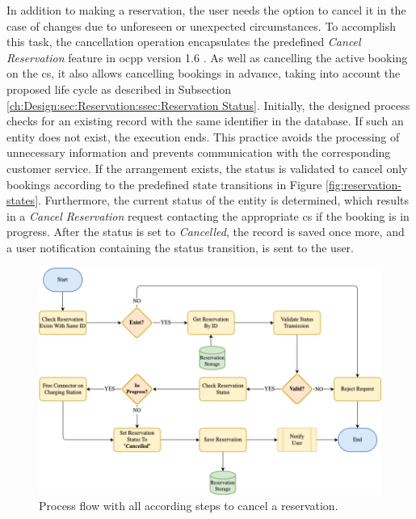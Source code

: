 In addition to making a reservation, the user needs the option to cancel it in the case of changes due to unforeseen or unexpected circumstances.
To accomplish this task, the cancellation operation encapsulates the predefined \textit{Cancel Reservation} feature in \acrshort{ocpp} version 1.6 \cite{noauthor_ocpp_nodate}. As well as cancelling the active booking on the \acrshort{cs}, it also allows cancelling bookings in advance, taking into account the proposed life cycle as described in Subsection \ref{ch:Design:sec:Reservation:ssec:Reservation Status}.
Initially, the designed process checks for an existing record with the same identifier in the database. If such an entity does not exist, the execution ends. This practice avoids the processing of unnecessary information and prevents communication with the corresponding customer service.
If the arrangement exists, the status is validated to cancel only bookings according to the predefined state transitions in Figure \ref{fig:reservation-states}. Furthermore, the current status of the entity is determined, which results in a \textit{Cancel Reservation} request contacting the appropriate \acrshort{cs} if the booking is in progress.
After the status is set to \textit{Cancelled}, the record is saved once more, and a user notification containing the status transition, is sent to the user.

\begin{figure}[h]
    \centering
    \includegraphics[scale=0.4]{resources/images/main/5_design/processes/ReservationCancel.png}
    \caption{Process flow with all according steps to cancel a reservation.}
    \label{fig:cancel-reservation-flowchart}
\end{figure}


